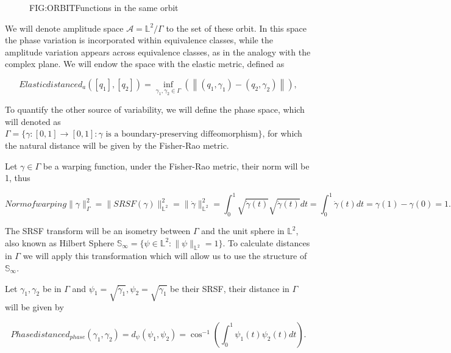 \begin{figure}[Functions in the same orbit]{FIG:ORBIT}{Functions in the same orbit}
   \quad
\end{figure}

We will denote amplitude space $\mathscr{A}= \mathbb{L}^{2} / \Gamma$  to the
set of these orbit. In this space the phase variation is incorporated within
equivalence classes, while the amplitude variation appears across equivalence
classes, as in the analogy with the complex plane. We will endow the space with
the elastic metric, defined as

\begin{equation}[EQ:ELASTIC]{Elastic distance}
d_{a}\left(\left[q_{1}\right],\left[q_{2}\right]\right)=\inf _{
\gamma_{1}, \gamma_{2} \in {\Gamma}}\left(\left\|\left(q_{1},
 \gamma_{1}\right)-\left(q_{2}, \gamma_{2}\right)\right\|\right),
\end{equation}

To quantify the other source of variability, we will define the phase space,
which will denoted as
$\Gamma = \{\gamma :[0,1] \rightarrow[0,1]  : \gamma \text{ is a boundary-preserving diffeomorphism}\}$,
for which the natural distance will be given by the Fisher-Rao metric.

Let $\gamma \in \Gamma$ be a warping function, under the Fisher-Rao metric,
their norm will be 1, thus

\begin{equation}[]{Norm of warping}
\| \gamma \|_\Gamma^2 = \| SRSF(\gamma)\|_{\mathbb{L}^2}^2 =  \| \dot \gamma\|_{\mathbb{L}^2}^2 =
\int_0^1 \sqrt{\dot \gamma (t)} \sqrt{\dot \gamma (t)}dt =
\int_0^1 \dot \gamma(t)dt = \gamma(1) - \gamma(0) = 1.
\end{equation}

The SRSF transform will be an isometry between $\Gamma$ and the unit sphere in
$\mathbb{L}^2$, also known as Hilbert Sphere
$\mathbb{S}_\infty = \{ \psi \in \mathbb{L}^2 : \|\psi\|_{\mathbb{L}^2}=1\}$.
To calculate distances in $\Gamma$ we will apply this transformation which will
allow us to use the structure of $\mathbb{S}_\infty$.

Let $\gamma_1, \gamma_2$ be in $\Gamma$ and $\psi_1=\sqrt{\dot \gamma_1},
\psi_2=\sqrt{\dot \gamma_1}$ be their SRSF, their distance in $\Gamma$ will be
given by

\begin{equation}[]{Phase distance}
d_{phase}(\gamma_1, \gamma_2) = d_{\psi}(\psi_1, \psi_2) =
\cos^{-1}\left (\int_0^1 \psi_1(t) \psi_2(t) dt\right ).
\end{equation}

